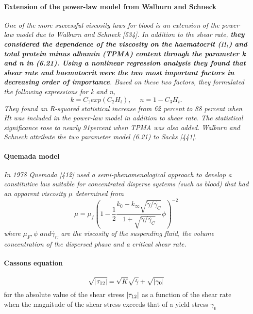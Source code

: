 \documentclass[11pt,letterpaper]{article}
\begin{document}
\paragraph{Extension of
the power-law model from Walburn and Schneck}
\textit{
One of the more successful viscosity laws for blood is an extension of
the power-law model due to Walburn and Schneck [534]. In addition to the
shear rate, \textbf{they considered the dependence of the viscosity on the haematocrit
($H_t$) and total protein minus albumin (TPMA) content through the parameter k and n in (6.21). Using a nonlinear regression analysis they found that
shear rate and haematocrit were the two most important factors in decreasing
order of importance}. Based on these two factors, they formulated the following
expressions for k and n,\begin{equation}
k = C_1 exp(C_2H_t), \hspace{15pt} n=1-C_3H_t.
\end{equation}
They found an R-squared statistical increase from 62 percent to 88 percent when Ht was included in the power-law model in addition to shear rate. The statistical significance rose to nearly 91percent  when TPMA was also added. Walburn and Schneck attribute the two parameter model (6.21) to Sacks [441].
}

\paragraph{Quemada model} \textit{In 1978 Quemada [412] used a semi-phenomenological approach to develop a constitutive law suitable for concentrated disperse systems (such as blood) that had an apparent viscosity $\mu$ determined from
\begin{equation}
    \mu = \mu_f (1 -\frac{1}{2}\frac{k_0+k_{\infty}\sqrt{\Dot{\gamma}/\Dot{\gamma_C}}}{1+\sqrt{\Dot{\gamma}/\Dot{\gamma_C}}}\phi)^{-2}
\end{equation}
where $\mu_F, \phi \hspace{4pt }and \Dot{\gamma_C}$ are the viscosity of the suspending fluid, the volume concentration of the dispersed phase and a critical shear rate.
}



\paragraph{Cassons equation}
\begin{equation}
    \sqrt{\abs{\tau_{12}}}= \sqrt{K}\sqrt{\Dot{\gamma}}+\sqrt{\abs{\gamma_0}}
\end{equation}
for the absolute value of the shear stress $\abs{\tau_{12}}$ as a function of the shear rate when the magnitude of the shear stress exceeds that of a yield stress $\gamma_0$
\end{document}
